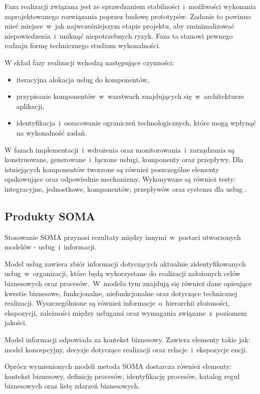Faza realizacji związana jest ze sprawdzaniem stabilności~i~możliwości wykonania zaprojektowanego rozwiązania poprzez budowę prototypów. Zadanie to powinno mieć miejsce~w~jak najwcześniejszym etapie projektu, aby zminimalizować niepowiedzenia~i~uniknąć niepotrzebnych ryzyk. Faza ta stanowi pewnego rodzaju formę technicznego studium wykonalności. 

W skład fazy realizacji wchodzą następujące czynności:
\begin{itemize}
\item{iteracyjna alokacja usług do komponentów,}
\item{przypisanie komponentów~w~warstwach znajdujących się~w~architekturze aplikacji,}
\item{identyfikacja~i~oszacowanie ograniczeń technologicznych, które mogą wpłynąć na wykonalność zadań.}
\end{itemize}

W fazach implementacji~i~wdrożenia oraz monitorowania~i~zarządzania są konstruowane, generowane~i~łączone usługi, komponenty oraz przepływy. Dla istniejących komponentów tworzone są również poszczególne elementy opakowujące oraz odpowiednie mechanizmy. Wykonywane są również testy: integracyjne, jednostkowe, komponentów, przepływów oraz systemu dla usług  \cite{PlatIntGor, SOMAArsIBMJour}.

\subsection{Produkty SOMA}
Stosowanie SOMA przynosi rezultaty między innymi~w~postaci utworzonych modelów - usług~i~informacji. 

Model usług zawiera zbiór informacji dotyczących aktualnie zidentyfikowanych usług~w~organizacji, które będą wykorzystane do realizacji założonych celów biznesowych oraz procesów.~W~modelu tym znajdują się również dane opisujące kwestie biznesowe, funkcjonalne, niefunkcjonalne oraz dotyczące technicznej realizacji. Wyszczególnione są również informacje~o~hierarchii złożoności, ekspozycji, zależności między usługami oraz wymagania związane~z~poziomem jakości. 

Model informacji odpowiada za kontekst biznesowy. Zawiera elementy takie jak: model koncepcyjny, decyzje dotyczące realizacji oraz relacje~i~ekspozycje encji.

Oprócz wymienionych modeli metoda SOMA dostarcza również elementy: kontekst biznesowy, definicję procesów, identyfikację procesów, katalog reguł biznesowych oraz listę zdarzeń biznesowych.

